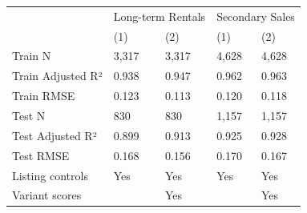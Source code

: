 \begin{tabular}{lllll}
\toprule
 & \multicolumn{2}{r}{Long-term Rentals} & \multicolumn{2}{r}{Secondary Sales} \\
 & (1) & (2) & (1) & (2) \\
\midrule
Train N & 3,317 & 3,317 & 4,628 & 4,628 \\
Train Adjusted R² & 0.938 & 0.947 & 0.962 & 0.963 \\
Train RMSE & 0.123 & 0.113 & 0.120 & 0.118 \\
Test N & 830 & 830 & 1,157 & 1,157 \\
Test Adjusted R² & 0.899 & 0.913 & 0.925 & 0.928 \\
Test RMSE & 0.168 & 0.156 & 0.170 & 0.167 \\
Listing controls & Yes & Yes & Yes & Yes \\
Variant scores &  & Yes &  & Yes \\
\bottomrule
\end{tabular}
